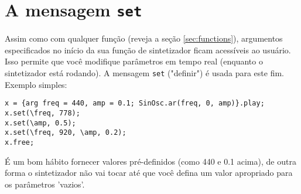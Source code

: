 \section{A mensagem \texttt{set}}

Assim como com qualquer função (reveja a seção \ref{sec:functions}), argumentos especificados no início da sua função de sintetizador ficam acessíveis ao usuário. Isso permite que você modifique parâmetros em tempo real (enquanto o sintetizador está rodando). A mensagem \texttt{set} ("definir") é usada para este fim. Exemplo simples:

\begin{lstlisting}[style=SuperCollider-IDE, basicstyle=\scttfamily\footnotesize]
x = {arg freq = 440, amp = 0.1; SinOsc.ar(freq, 0, amp)}.play;
x.set(\freq, 778);
x.set(\amp, 0.5);
x.set(\freq, 920, \amp, 0.2);
x.free;
\end{lstlisting}

É um bom hábito fornecer valores pré-definidos (como 440 e 0.1 acima), de outra forma o sintetizador não vai tocar até que você defina um valor apropriado para os parâmetros 'vazios'.
